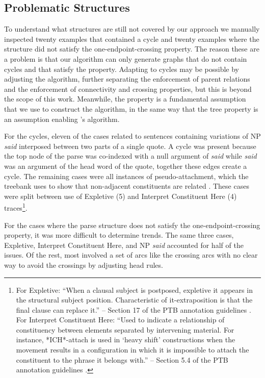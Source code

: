 \subsection{Problematic Structures}

To understand what structures are still not covered by our approach we manually inspected twenty examples that contained a cycle and twenty examples where the structure did not satisfy the one-endpoint-crossing property.
The reason these are a problem is that our algorithm can only generate graphs that do not contain cycles and that satisfy the \oneEC property.
Adapting to cycles may be possible by adjusting the algorithm, further separating the enforcement of parent relations and the enforcement of connectivity and crossing properties, but this is beyond the scope of this work.
Meanwhile, the \oneEC property is a fundamental assumption that we use to construct the algorithm, in the same way that the tree property is an assumption enabling \textcite{eisner:1996}'s algorithm.

For the cycles, eleven of the cases related to sentences containing variations of NP \emph{said} interposed between two parts of a single quote.
A cycle was present because the top node of the parse was co-indexed with a null argument of \emph{said} while \emph{said} was an argument of the head word of the quote, together these edges create a cycle.
The remaining cases were all instances of pseudo-attachment, which the treebank uses to show that non-adjacent constituents are related \parencite{ptb-guide}.
These cases were split between use of Expletive (5) and Interpret Constituent Here (4) traces\footnote{
For Expletive: ``When a clausal subject is postposed, expletive it appears in the structural subject position.
Characteristic of it-extraposition is that the final clause can replace it.'' -- Section 17 of the PTB annotation guidelines \parencite{ptb-guide}. \\
For Interpret Constituent Here: ``Used to indicate a relationship of constituency between elements separated by intervening material.
For instance, *ICH*-attach is used in `heavy shift' constructions when the movement results in a configuration in which it is impossible to attach the constituent to the phrase it belongs with.'' -- Section 5.4 of the PTB annotation guidelines \parencite{ptb-guide}.
}.

For the cases where the parse structure does not satisfy the one-endpoint-crossing property, it was more difficult to determine trends.
The same three cases, Expletive, Interpret Constituent Here, and NP \emph{said} accounted for half of the issues.
Of the rest, most involved a set of arcs like the crossing arcs with no clear way to avoid the crossings by adjusting head rules.

